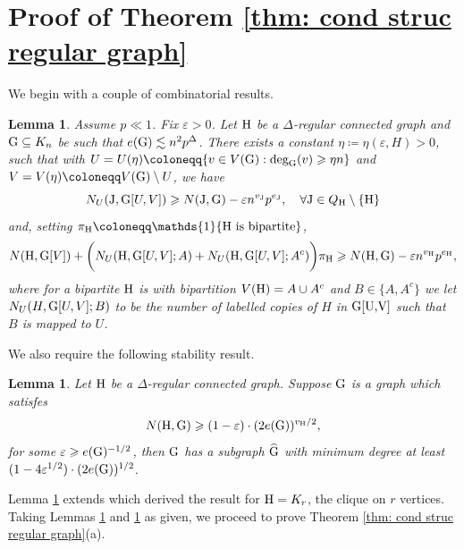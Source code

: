 \documentclass[a4paper,11pt,english,reqno]{amsart}
\numberwithin{equation}{section}
\renewcommand{\geq}{\geqslant}
\newcommand{\uH}{\textup{H}}
\newcommand{\tu}[1]{\textup{#1}}
\newtheorem{lemma}[theorem]{Lemma}
\begin{document}

{}

\appendix
\section{Proof of Theorem \ref{thm: cond struc regular graph}}\label{sec:proof-regular}
We begin with a couple of combinatorial results.
\begin{lemma}
\label{cond_struc:bipartite lemma regular}
Assume $p\ll1$. Fix $\varepsilon>0$. Let $\tu{H}$ be a $\Delta$-regular connected graph and $\tu{G}\subseteq K_{n}$ be such that $e(\tu{G})\lesssim n^{2}p^{\Delta}$. There exists a constant $\eta\coloneqq \eta(\varepsilon, H)>0$, such that with $U= U(\eta)\coloneqq\{v\in V(\tu{G}):\tu{deg}_{\tu{G}}(v)\geq \eta n\}$ and $V=V(\eta)\coloneqq V(\tu{G})\setminus U$, we have
\begin{equation}
	\label{Q_H structural}
	N_{U}(\tu{J},\tu{G}[U,V])\geq N(\tu{J}, \tu{G})-\varepsilon n^{v_{\tu{J}}}p^{e_{\tu{J}}}, \quad \forall \tu{J}\in Q_{\uH}\setminus\{ {\uH}\}
\end{equation}
and, setting $\pi_{\tu{H}} \coloneqq \mathds{1}\{\tu{H is bipartite}\}$,
\begin{equation}
	\label{H structural}
	N(\uH, \tu{G}[V]) + \bigg(N_{U}(\tu{H}, \tu{G}[U,V];A)+N_{U}(\tu{H}, \tu{G}[U,V]; A^{c})\bigg)\pi_{\tu{H}}\geq N(\uH, \tu{G})-\varepsilon n^{v_{\uH}}p^{e_{\uH}},
\end{equation}
where for a bipartite $\uH$ is with bipartition $V(\uH)=A\cup A^{c}$ and $B \in \{A, A^c\}$ we let $N_{U}(H, \tu{G}[U,V]; B)$ %
to be the number of labelled copies of $H$ in $\tu{G[U,V]}$ such that $B$ %
is mapped to $U$.
\end{lemma}
We also require the following stability result. %



\begin{lemma}
\label{stability:regular}
Let $\uH$ be a $\Delta$-regular connected graph. Suppose $\tu{G}$ is a graph which satisfes 
\begin{equation*}
	N(\uH, \tu{G})\geq (1-\varepsilon)\cdot (2e(\tu{G}))^{v_{\uH}/2}, 
\end{equation*}  
for some $\varepsilon\geq e(\tu{G})^{-1/2}$, then $\tu{G}$ has a subgraph $\widehat{\tu{G}}$ with minimum degree at least $(1-4\varepsilon^{1/2})\cdot (2e(\tu{G}))^{1/2}$. 
\end{lemma}
Lemma \ref{stability:regular} extends \cite[Theorem 5.11]{HMS} which derived the result for $\tu{H}=K_r$, the clique on $r$ vertices.
Taking Lemmas \ref{cond_struc:bipartite lemma regular} and \ref{stability:regular} as given, we proceed to prove Theorem \ref{thm: cond struc regular graph}(a).
\end{document}
